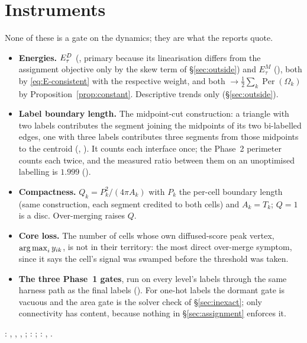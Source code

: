 \documentclass[11pt,a4paper]{article}
\begin{document}
\section{Instruments}
\label{sec:instruments}

None of these is a gate on the dynamics; they are what the reports quote.
\begin{itemize}[itemsep=1pt]
  \item \textbf{Energies.} $E^{D}_\tau$ (, primary because
    its linearisation differs from the assignment objective only by the skew
    term of \S\ref{sec:outside}) and $E^M_\tau$ (),
    both by \eqref{eq:E-consistent} with the respective weight, and both
    $\to \tfrac12 \sum_k \operatorname{Per}(\Omega_k)$ by
    Proposition~\ref{prop:constant}. Descriptive trends only (\S\ref{sec:outside}).
  \item \textbf{Label boundary length.} The midpoint-cut construction: a
    triangle with two labels contributes the segment joining the midpoints of
    its two bi-labelled edges, one with three labels contributes three segments
    from those midpoints to the centroid (,
    ). It counts each interface
    once; the Phase~2 perimeter counts each twice, and the measured ratio between
    them on an unoptimised labelling is $1.999$ ().
  \item \textbf{Compactness.} $Q_k = P_k^2 / (4\pi A_k)$ with $P_k$ the
    per-cell boundary length (same construction, each segment credited to both
    cells) and $A_k = T_k$; $Q = 1$ is a disc. Over-merging raises $Q$.
  \item \textbf{Core loss.} The number of cells whose own diffused-score peak
    vertex, $\operatorname*{arg\,max}_i y_{ik}$, is not in their territory: the most direct
    over-merge symptom, since it says the cell's signal was swamped before the
    threshold was taken.
  \item \textbf{The three Phase~1 gates}, run on every level's labels through
    the same harness path as the final labels (). For one-hot
    labels the dormant gate is vacuous and the area gate is the solver check of
    \S\ref{sec:inexact}; only connectivity has content, because nothing in
    \S\ref{sec:assignment} enforces it.
\end{itemize}

\begin{tcolorbox}[colback=blue!4!white, colframe=blue!40!black,
                  title={Code: instruments}, fontupper=\small]
: ,
, , ;
: ;
: , .
\end{tcolorbox}
\end{document}
